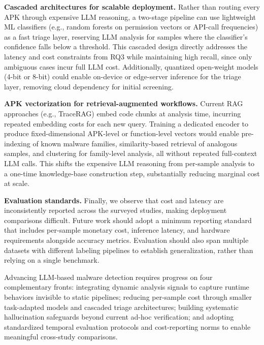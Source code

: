 \textbf{Cascaded architectures for scalable deployment.}
Rather than routing every APK through expensive LLM reasoning, a two-stage pipeline can use lightweight ML classifiers (e.g., random forests on permission vectors or API-call frequencies) as a fast triage layer, reserving LLM analysis for samples where the classifier's confidence falls below a threshold. This cascaded design directly addresses the latency and cost constraints from RQ3 while maintaining high recall, since only ambiguous cases incur full LLM cost. Additionally, quantized open-weight models (4-bit or 8-bit) could enable on-device or edge-server inference for the triage layer, removing cloud dependency for initial screening.

\textbf{APK vectorization for retrieval-augmented workflows.}
Current RAG approaches (e.g., TraceRAG) embed code chunks at analysis time, incurring repeated embedding costs for each new query. Training a dedicated encoder to produce fixed-dimensional APK-level or function-level vectors would enable pre-indexing of known malware families, similarity-based retrieval of analogous samples, and clustering for family-level analysis, all without repeated full-context LLM calls. This shifts the expensive LLM reasoning from per-sample analysis to a one-time knowledge-base construction step, substantially reducing marginal cost at scale.

\textbf{Evaluation standards.}
Finally, we observe that cost and latency are inconsistently reported across the surveyed studies, making deployment comparisons difficult. Future work should adopt a minimum reporting standard that includes per-sample monetary cost, inference latency, and hardware requirements alongside accuracy metrics. Evaluation should also span multiple datasets with different labeling pipelines to establish generalization, rather than relying on a single benchmark.

\begin{tcolorbox}[
    title=\textbf{RQ4 -- Key Takeaways},
    colback=white,
    colframe=blue!60!black,
    colbacktitle=blue!60!black,
    fonttitle=\bfseries\color{white},
    boxrule=0.5pt
]
Advancing LLM-based malware detection requires progress on four complementary fronts: integrating dynamic analysis signals to capture runtime behaviors invisible to static pipelines; reducing per-sample cost through smaller task-adapted models and cascaded triage architectures; building systematic hallucination safeguards beyond current ad-hoc verification; and adopting standardized temporal evaluation protocols and cost-reporting norms to enable meaningful cross-study comparisons.
\end{tcolorbox}
